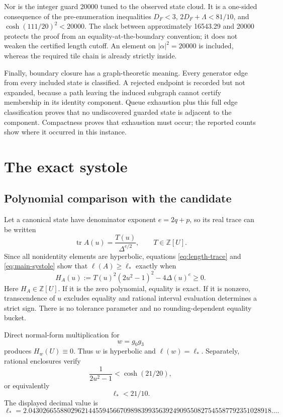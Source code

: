 \documentclass[11pt,a4paper]{article}
\theoremstyle{definition}
\newcommand{\Z}{\mathbb Z}
\newcommand{\tr}{\operatorname{tr}}
\newcommand{\length}{\ell}
\begin{document}
Nor is the integer guard 20000 tuned to the observed state cloud.  It is a
one-sided consequence of the pre-enumeration inequalities
\(D_F<3\), \(2D_F+\Lambda<81/10\), and
\(\cosh(111/20)^2<20000\).  The slack between approximately 16543.29 and
20000 protects the proof from an equality-at-the-boundary convention; it does
not weaken the certified length cutoff.  An element on
\(|\alpha|^2=20000\) is included, whereas the required tile chain is already
strictly inside.

Finally, boundary closure has a graph-theoretic meaning.  Every generator edge
from every included state is classified.  A rejected endpoint is recorded but
not expanded, because a path leaving the induced subgraph cannot certify
membership in its identity component.  Queue exhaustion plus this full edge
classification proves that no undiscovered guarded state is adjacent to the
component.  Compactness proves that exhaustion must occur; the reported counts
show where it occurred in this instance.

\section{The exact systole}
\label{sec:systole}

\subsection{Polynomial comparison with the candidate}

Let a canonical state have denominator exponent \(e=2q+p\), so its real
trace can be written
\[
 \tr A(u)=\frac{T(u)}{\Delta^{e/2}},\qquad T\in\Z[U].
\]
Since all nonidentity elements are hyperbolic, equations
\eqref{eq:length-trace} and \eqref{eq:main-systole} show that
\(\length(A)\geq\length_*\) exactly when
\begin{equation}\label{eq:H}
 H_A(u):=T(u)^2(2u^2-1)^2-4\Delta(u)^e\geq0.
\end{equation}
Here \(H_A\in\Z[U]\).  If it is the zero polynomial, equality is exact.  If it
is nonzero, transcendence of \(u\) excludes equality and rational interval
evaluation determines a strict sign.  There is no tolerance parameter and no
rounding-dependent equality bucket.

Direct normal-form multiplication for
\begin{equation}\label{eq:witness}
 w=g_0g_3
\end{equation}
produces \(H_w(U)\equiv0\).  Thus \(w\) is hyperbolic and
\(\length(w)=\length_*\).  Separately, rational enclosures verify
\[
 \frac{1}{2u^2-1}<\cosh(21/20),
\]
or equivalently
\begin{equation}\label{eq:candidate-cutoff}
 \length_*<21/10.
\end{equation}
The displayed decimal value is
\[
 \length_*=2.043026655880296214455945667098983993563924909550827545587792351028918\ldots.
\]
\end{document}
